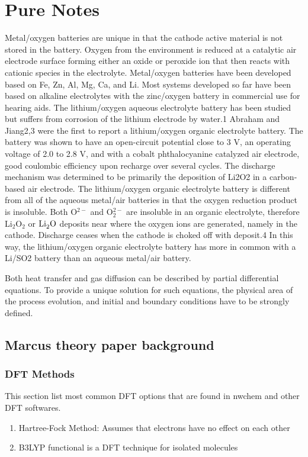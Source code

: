 \documentclass[12pt]{book}
\begin{document}
\chapter{Pure Notes}
Metal/oxygen batteries are unique in that the cathode active material is not stored in the battery. Oxygen from the environment is reduced at a catalytic air electrode surface forming either an oxide or peroxide ion that then reacts with cationic species in the electrolyte. Metal/oxygen batteries have been developed based on Fe, Zn, Al, Mg, Ca, and Li. Most systems developed so far have been based on alkaline electrolytes with the zinc/oxygen battery in commercial use for hearing aids. The lithium/oxygen aqueous electrolyte battery has been studied but suffers from corrosion of the lithium electrode by water.1 Abraham and Jiang2,3 were the first to report a lithium/oxygen organic electrolyte battery. The battery was shown to have an open-circuit potential close to 3 V, an operating voltage of 2.0 to 2.8 V, and with a cobalt phthalocyanine catalyzed air electrode, good coulombic efficiency upon recharge over several cycles. The discharge mechanism was determined to be primarily the deposition of Li2O2 in a carbon-based air electrode. 
The lithium/oxygen organic electrolyte battery is different from all of the aqueous metal/air batteries in that the oxygen reduction product is insoluble. Both O$^{2-}$  and O$_2^{2-}$ are insoluble in an organic electrolyte, therefore Li$_2$O$_2$ or $\ce{Li2O}$ deposits near where the oxygen ions are generated, namely in the cathode. Discharge ceases when the cathode is choked off with deposit.4 In this way, the lithium/oxygen organic electrolyte battery has more in common with a Li/SO2 battery than an aqueous metal/air battery.

Both heat transfer and gas diffusion can be described by partial differential equations. To provide a unique solution for such equations, the physical area of the process evolution, and initial and boundary conditions have to be strongly defined.
\section{Marcus theory paper background}
\subsection{DFT Methods}
This section list most common DFT options that are found in nwchem and other DFT softwares.

\begin{enumerate}

\item Hartree-Fock Method: Assumes that electrons have no effect on each other
\item B3LYP functional is a DFT technique for isolated molecules
\end{enumerate}
\end{document}
